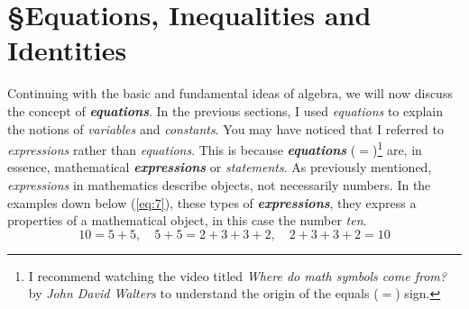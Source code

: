 \section{\S Equations, Inequalities and Identities}
Continuing with the basic and fundamental ideas of algebra, we will now discuss the concept of \textbf{\textit{equations}}. In the previous sections, I used \textit{equations} to explain the notions of \textit{variables} and \textit{constants}. You may have noticed that I referred to \textit{expressions} rather than \textit{equations}. This is because \textbf{\textit{equations}} ($=$)\footnote{I recommend watching the video titled \textit{Where do math symbols come from?} by \textit{John David Walters} to understand the origin of the equals ($=$) sign.} are, in essence, mathematical \textbf{\textit{expressions}} or \textit{statements}. As previously mentioned, \textit{expressions} in mathematics describe objects, not necessarily numbers. In the examples down below  (\ref{eq:7}), these types of \textbf{\textit{expressions}}, they express a properties of a mathematical object, in this case the number \textit{ten}.
\begin{equation} \label{eq:7}
  10 = 5 + 5,\quad 5 + 5 = 2 + 3 + 3 + 2,\quad 2 + 3 + 3 + 2 = 10
\end{equation}

